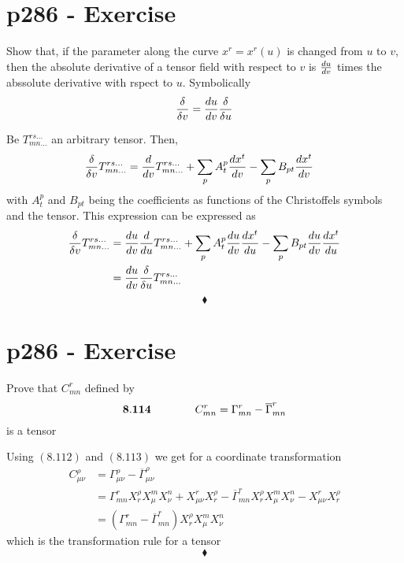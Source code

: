 \section{p286 - Exercise}
\begin{tcolorbox}
Show that, if the parameter along the curve $x^r=x^r(u)$ is changed from $u$ to $v$, then the absolute derivative of a tensor field with respect to $v$ is $\dv{u}{v}$ times the abssolute derivative with rspect to $u$. Symbolically
$$\fdv{}{v}= \dv{u}{v}\fdv{}{u}$$
\end{tcolorbox}
Be $T^{rs\dots}_{mn\dots}$ an arbitrary tensor. Then,
\begin{align}
\fdv{}{v}T^{rs\dots}_{mn\dots} &= \dv{}{v}T^{rs\dots}_{mn\dots}+ \sum_{p} A^p_t \dv{x^t}{v} - \sum_{p} B_{pt} \dv{x^t}{v} 
\end{align}
with $A^p_t$ and $B_{pt}$ being the coefficients as functions of the Christoffels symbols and the tensor.
This expression can be expressed as 
\begin{align}
\fdv{}{v}T^{rs\dots}_{mn\dots} &= \dv{u}{v}\dv{}{u}T^{rs\dots}_{mn\dots}+ \sum_{p} A^p_t  \dv{u}{v}\dv{x^t}{u} - \sum_{p} B_{pt}  \dv{u}{v}\dv{x^t}{u} \\
&=\dv{u}{v}\fdv{}{u}T^{rs\dots}_{mn\dots}
\end{align}
$$\blacklozenge$$
\newpage

\section{p286 - Exercise}
\begin{tcolorbox}
Prove that $C^r_{mn}$ defined by 
$$\mathbf{8.114}\quad\quad\quad\quad C^r_{mn}=\Gamma^r_{mn}-\overline{\Gamma}^r_{mn}$$
is a tensor 
\end{tcolorbox}
Using $\mathbf{(8.112)}$ and $\mathbf{(8.113)}$ we get for a coordinate transformation
\begin{align}
C^{\rho}_{\mu \nu }&=\Gamma^{\rho}_{\mu \nu }-\overline{\Gamma}^{\rho}_{\mu \nu }\\
&= \Gamma^{r}_{mn}X^{\rho}_{r}X^{m}_{\mu}X^{n}_{\nu}+ X^{r}_{\mu \nu}X^{\rho}_{r}-\overline{\Gamma}^{r}_{mn}X^{\rho}_{r}X^{m}_{\mu}X^{n}_{\nu}- X^{r}_{\mu \nu}X^{\rho}_{r}\\
&= \left(\Gamma^{r}_{mn}- \overline{\Gamma}^{r}_{mn}\right) X^{\rho}_{r}X^{m}_{\mu}X^{n}_{\nu}
\end{align}
which is the transformation rule for a tensor 
$$\blacklozenge$$
\newpage



